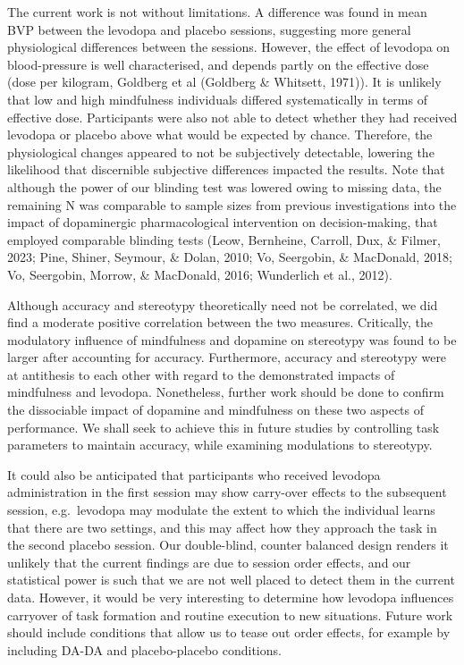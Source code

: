\documentclass[
  man]{apa6}
\begin{document}
The current work is not without limitations. A difference was found in mean BVP between the levodopa and placebo sessions, suggesting more general physiological differences between the sessions. However, the effect of levodopa on blood-pressure is well characterised, and depends partly on the effective dose (dose per kilogram, Goldberg et al (Goldberg \& Whitsett, 1971)). It is unlikely that low and high mindfulness individuals differed systematically in terms of effective dose. Participants were also not able to detect whether they had received levodopa or placebo above what would be expected by chance. Therefore, the physiological changes appeared to not be subjectively detectable, lowering the likelihood that discernible subjective differences impacted the results. Note that although the power of our blinding test was lowered owing to missing data, the remaining N was comparable to sample sizes from previous investigations into the impact of dopaminergic pharmacological intervention on decision-making, that employed comparable blinding tests (Leow, Bernheine, Carroll, Dux, \& Filmer, 2023; Pine, Shiner, Seymour, \& Dolan, 2010; Vo, Seergobin, \& MacDonald, 2018; Vo, Seergobin, Morrow, \& MacDonald, 2016; Wunderlich et al., 2012).

Although accuracy and stereotypy theoretically need not be correlated, we did find a moderate positive correlation between the two measures. Critically, the modulatory influence of mindfulness and dopamine on stereotypy was found to be larger after accounting for accuracy. Furthermore, accuracy and stereotypy were at antithesis to each other with regard to the demonstrated impacts of mindfulness and levodopa. Nonetheless, further work should be done to confirm the dissociable impact of dopamine and mindfulness on these two aspects of performance. We shall seek to achieve this in future studies by controlling task parameters to maintain accuracy, while examining modulations to stereotypy.

It could also be anticipated that participants who received levodopa administration in the first session may show carry-over effects to the subsequent session, e.g.~levodopa may modulate the extent to which the individual learns that there are two settings, and this may affect how they approach the task in the second placebo session. Our double-blind, counter balanced design renders it unlikely that the current findings are due to session order effects, and our statistical power is such that we are not well placed to detect them in the current data. However, it would be very interesting to determine how levodopa influences carryover of task formation and routine execution to new situations. Future work should include conditions that allow us to tease out order effects, for example by including DA-DA and placebo-placebo conditions.
\end{document}
